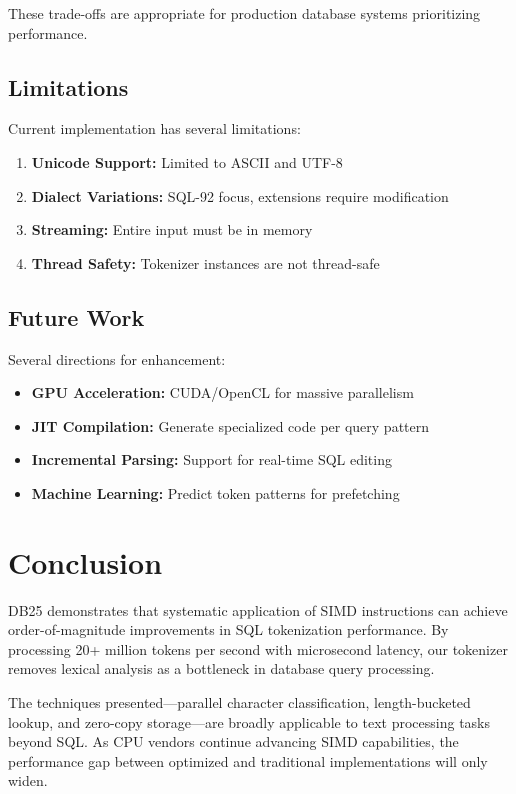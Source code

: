 \documentclass[conference]{IEEEtran}
\begin{document}
These trade-offs are appropriate for production database systems prioritizing performance.

\subsection{Limitations}

Current implementation has several limitations:

\begin{enumerate}
\item \textbf{Unicode Support:} Limited to ASCII and UTF-8
\item \textbf{Dialect Variations:} SQL-92 focus, extensions require modification
\item \textbf{Streaming:} Entire input must be in memory
\item \textbf{Thread Safety:} Tokenizer instances are not thread-safe
\end{enumerate}

\subsection{Future Work}

Several directions for enhancement:

\begin{itemize}
\item \textbf{GPU Acceleration:} CUDA/OpenCL for massive parallelism
\item \textbf{JIT Compilation:} Generate specialized code per query pattern
\item \textbf{Incremental Parsing:} Support for real-time SQL editing
\item \textbf{Machine Learning:} Predict token patterns for prefetching
\end{itemize}

\section{Conclusion}

DB25 demonstrates that systematic application of SIMD instructions can achieve order-of-magnitude improvements in SQL tokenization performance. By processing 20+ million tokens per second with microsecond latency, our tokenizer removes lexical analysis as a bottleneck in database query processing.

The techniques presented—parallel character classification, length-bucketed lookup, and zero-copy storage—are broadly applicable to text processing tasks beyond SQL. As CPU vendors continue advancing SIMD capabilities, the performance gap between optimized and traditional implementations will only widen.
\end{document}
